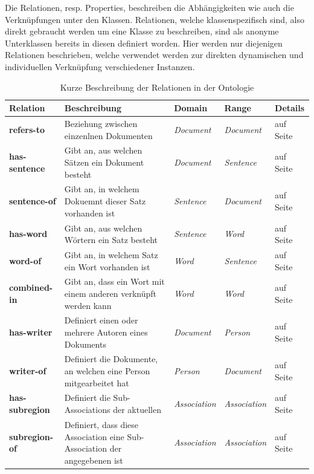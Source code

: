 \documentclass[
    11pt,
    latin1,
    a4paper,
    oneside
]{scrreprt}
\begin{document}
Die Relationen, resp. Properties, beschreiben die Abh\"angigkeiten wie auch die Verkn\"upfungen unter den Klassen. Relationen, welche klassenspezifisch sind, also direkt gebraucht werden um eine Klasse zu beschreiben, sind als anonyme Unterklassen bereits in diesen definiert worden. Hier werden nur diejenigen Relationen beschrieben, welche verwendet werden zur direkten dynamischen und individuellen Verkn\"upfung verschiedener Instanzen.

\begin{table}[H]
  \centering
  \begin{tabular}{ | l | p{4cm} | p{3cm} | p{2cm} | p{2cm} | }
    \hline
    \textbf{Relation} & \textbf{Beschreibung} & \textbf{Domain} & \textbf{Range} & \textbf{Details} \\ \hline
    \textbf{refers-to} & Beziehung zwischen einzenlnen Dokumenten & \emph{Document} & \emph{Document} & \nameref{sec:rel_refersto} auf Seite \pageref{sec:rel_refersto} \\ \hline
    \textbf{has-sentence} & Gibt an, aus welchen S\"atzen ein Dokument besteht & \emph{Document} & \emph{Sentence} & \nameref{sec:rel_hassentence} auf Seite \pageref{sec:rel_hassentence} \\ \hline
    \textbf{sentence-of} & Gibt an, in welchem Dokuemnt dieser Satz vorhanden ist & \emph{Sentence} & \emph{Document} & \nameref{sec:rel_sentenceof} auf Seite \pageref{sec:rel_sentenceof} \\ \hline
    \textbf{has-word} & Gibt an, aus welchen W\"ortern ein Satz besteht & \emph{Sentence} & \emph{Word} & \nameref{sec:rel_hasword} auf Seite \pageref{sec:rel_hasword} \\ \hline
    \textbf{word-of} & Gibt an, in welchem Satz ein Wort vorhanden ist & \emph{Word} & \emph{Sentence} & \nameref{sec:rel_wordof} auf Seite \pageref{sec:rel_wordof} \\ \hline
    \textbf{combined-in} & Gibt an, dass ein Wort mit einem anderen verkn\"upft werden kann & \emph{Word} & \emph{Word} & \nameref{sec:rel_wordcombo} auf Seite \pageref{sec:rel_wordcombo} \\ \hline
    \textbf{has-writer} & Definiert einen oder mehrere Autoren eines Dokuments & \emph{Document} & \emph{Person} & \nameref{sec:rel_haswriter} auf Seite \pageref{sec:rel_haswriter} \\ \hline
    \textbf{writer-of} & Definiert die Dokumente, an welchen eine Person mitgearbeitet hat & \emph{Person} & \emph{Document} & \nameref{sec:rel_writerof} auf Seite \pageref{sec:rel_writerof} \\ \hline
    \textbf{has-subregion} & Definiert die Sub-Associations der aktuellen & \emph{Association} & \emph{Association} & \nameref{sec:rel_hassubregion} auf Seite \pageref{sec:rel_hassubregion} \\ \hline
    \textbf{subregion-of} & Definiert, dass diese Association eine Sub-Association der angegebenen ist & \emph{Association} & \emph{Association} & \nameref{sec:rel_subregionof} auf Seite \pageref{sec:rel_subregionof} \\ \hline
  \end{tabular}
  \caption{Kurze Beschreibung der Relationen in der Ontologie}
  \label{tbl:classes}
\end{table}
\end{document}
